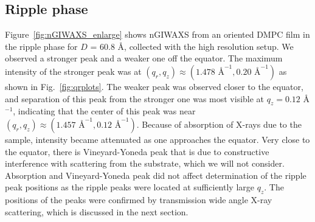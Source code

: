 \subsection{Ripple phase}\label{sec:nGIWAXS_ripple_phase}
Figure~\ref{fig:nGIWAXS_enlarge} shows nGIWAXS from an oriented DMPC film
in the ripple phase for $D$ = 60.8 \AA, collected with the high resolution setup. 
We observed a stronger peak and a weaker one off the equator. 
The maximum intensity of the stronger peak was at 
$(q_r, q_z) \approx (1.478 \text{ \AA}^{-1}, 0.20 \text{ \AA}^{-1})$ as shown
in Fig.~\ref{fig:qrplots}. The weaker peak was observed closer to the equator, and
separation of this peak from the stronger one was most visible at 
$q_z = 0.12$ \AA$^{-1}$, indicating that the center of this peak was near
$(q_r, q_z) \approx (1.457 \text{ \AA}^{-1}, 0.12 \text{ \AA}^{-1})$. 
Because of absorption of X-rays due to the sample, 
intensity became attenuated as one approaches the equator.
Very close to the equator, there is Vineyard-Yoneda 
peak that is due to constructive interference with scattering from the substrate,
which we will not consider.
Absorption and Vineyard-Yoneda peak did not affect determination of the 
ripple peak positions
as the ripple peaks were located at sufficiently large $q_z$. 
The positions of the peaks were confirmed by transmission wide angle X-ray 
scattering, which is discussed in the next section.

